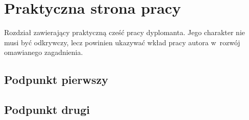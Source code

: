 \chapter{Praktyczna strona pracy}
\label{cha:rozdzialTrzeci}

Rozdział zawierający praktyczną cześć pracy dyplomanta. Jego charakter nie musi być odkrywczy, lecz powinien ukazywać wkład pracy autora w~rozwój omawianego zagadnienia.

\section{Podpunkt pierwszy}
\label{sec:podpunkt_pierwszy}
\lipsum[34-35]

\section{Podpunkt drugi}
\label{sec:podpunkt_drugi}
\lipsum[100-102]